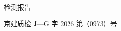 \documentclass[11pt, a4paper, UTF8]{ctexart}
\newcommand{\ReportYear}{2026}
\newcommand{\ReportNo}{0973}
\begin{document}

\begin{titlepage}
    \pagestyle{empty}
    
    \vspace*{20mm}

    \begin{center}
        {\heiti{} 检\hspace{0.5\ccwd}测\hspace{0.5\ccwd}报\hspace{0.5\ccwd}告}
    \end{center}

    \vspace{0mm}

    \begin{center}
        {\songti{} 京建质检 J—G 字 \ReportYear{} 第（\ReportNo{}）号}
    \end{center}

    \vspace{40mm} 


\end{titlepage}
\end{document}
